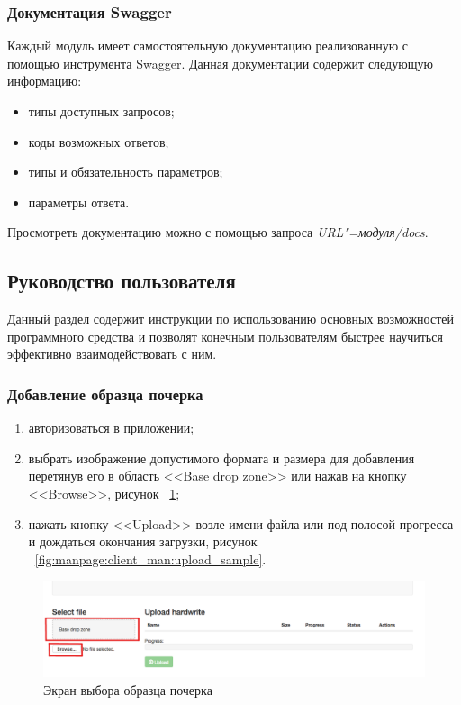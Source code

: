 \subsubsection{Документация Swagger}
Каждый модуль имеет самостоятельную документацию реализованную с помощью инструмента Swagger.
Данная документации содержит следующую информацию:
\begin{itemize}
    \item типы доступных запросов;
    \item коды возможных ответов;
    \item типы и обязательность параметров;
    \item параметры ответа.
\end{itemize}

Просмотреть документацию можно с помощью запроса \emph{URL"=модуля/docs}.

\subsection{Руководство пользователя}
\label{sec:manpage:client_man}
Данный раздел содержит инструкции по использованию основных возможностей программного средства и позволят конечным пользователям быстрее научиться эффективно взаимодействовать с ним.

\subsubsection{Добавление образца почерка}
\label{sec:manpage:client_man:add_sample}
\begin{enumerate}
    \item[1)] авторизоваться в приложении;
    \item[2)] выбрать изображение допустимого формата и размера для добавления перетянув его в область <<Base drop zone>> или нажав на кнопку <<Browse>>, рисунок ~\ref{fig:manpage:client_man:add_sample};
    \item[3)] нажать кнопку <<Upload>> возле имени файла или под полосой прогресса и дождаться окончания загрузки, рисунок ~\ref{fig:manpage:client_man:upload_sample}. 
\end{enumerate}

\begin{figure}[ht]
    \centering
    \includegraphics[width=0.6\textheight]{figures/select_sample_man.png}
    \caption{Экран выбора образца почерка}
    \label{fig:manpage:client_man:add_sample}
\end{figure}

